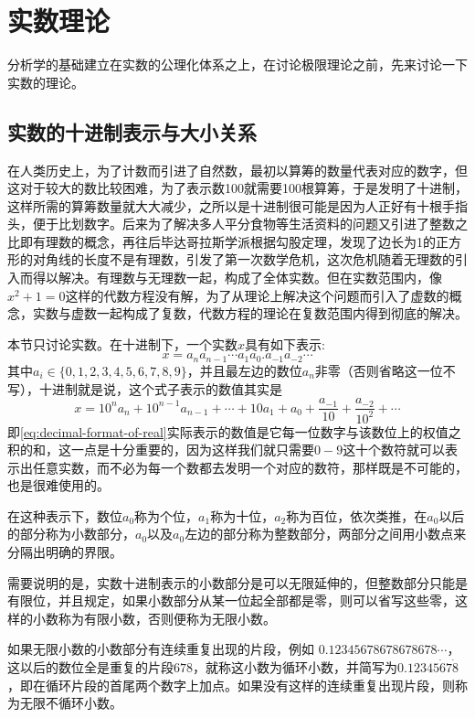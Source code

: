 
\section{实数理论}
\label{sec:real-number-theory}

分析学的基础建立在实数的公理化体系之上，在讨论极限理论之前，先来讨论一下实数的理论。

\subsection{实数的十进制表示与大小关系}
\label{sec:decimal-system}

在人类历史上，为了计数而引进了自然数，最初以算筹的数量代表对应的数字，但这对于较大的数比较困难，为了表示数100就需要100根算筹，于是发明了十进制，这样所需的算筹数量就大大减少，之所以是十进制很可能是因为人正好有十根手指头，便于比划数字。后来为了解决多人平分食物等生活资料的问题又引进了整数之比即有理数的概念，再往后毕达哥拉斯学派根据勾股定理，发现了边长为1的正方形的对角线的长度不是有理数，引发了第一次数学危机，这次危机随着无理数的引入而得以解决。有理数与无理数一起，构成了全体实数。但在实数范围内，像$x^2+1=0$这样的代数方程没有解，为了从理论上解决这个问题而引入了虚数的概念，实数与虚数一起构成了复数，代数方程的理论在复数范围内得到彻底的解决。

本节只讨论实数。在十进制下，一个实数$x$具有如下表示:
\begin{equation}
  \label{eq:decimal-format-of-real}
 x=a_na_{n-1}\cdots a_1a_0.a_{-1}a_{-2}\cdots 
\end{equation}
其中$a_i \in \{0,1,2,3,4,5,6,7,8,9 \}$，并且最左边的数位$a_n$非零（否则省略这一位不写），十进制就是说，这个式子表示的数值其实是
\[ x=10^na_n+10^{n-1}a_{n-1}+\cdots+10a_1+a_0+\frac{a_{-1}}{10}+\frac{a_{-2}}{10^2}+\cdots \]
即\autoref{eq:decimal-format-of-real}实际表示的数值是它每一位数字与该数位上的权值之积的和，这一点是十分重要的，因为这样我们就只需要$0-9$这十个数符就可以表示出任意实数，而不必为每一个数都去发明一个对应的数符，那样既是不可能的，也是很难使用的。

在这种表示下，数位$a_0$称为个位，$a_1$称为十位，$a_2$称为百位，依次类推，在$a_0$以后的部分称为小数部分，$a_0$以及$a_0$左边的部分称为整数部分，两部分之间用小数点来分隔出明确的界限。

需要说明的是，实数十进制表示的小数部分是可以无限延伸的，但整数部分只能是有限位，并且规定，如果小数部分从某一位起全部都是零，则可以省写这些零，这样的小数称为有限小数，否则便称为无限小数。

如果无限小数的小数部分有连续重复出现的片段，例如 $0.12345678678678678\cdots$，这以后的数位全是重复的片段$678$，就称这小数为循环小数，并简写为$0.12345\dot{6}7\dot{8}$，即在循环片段的首尾两个数字上加点。如果没有这样的连续重复出现片段，则称为无限不循环小数。

